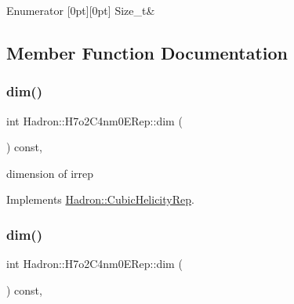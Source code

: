 \begin{DoxyEnumFields}{Enumerator}
[0pt][0pt]{}\mbox{\label{structHadron_1_1H7o2C4nm0ERep_a7de8eb68f5cce7258fc6e40d6bca862caddeac2d7be29ccf0b208d4254ce42357}} 
Size\+\_\+t&\\
\hline

\end{DoxyEnumFields}


\subsection{Member Function Documentation}
\mbox{\label{structHadron_1_1H7o2C4nm0ERep_aed3aeb03b51c80a7ee0d02b8cc1a3ecf}} 
\subsubsection{\texorpdfstring{dim()}{dim()}\hspace{0.1cm}{\footnotesize\ttfamily [1/3]}}
{\footnotesize\ttfamily int Hadron\+::\+H7o2\+C4nm0\+E\+Rep\+::dim (\begin{DoxyParamCaption}{ }\end{DoxyParamCaption}) const\hspace{0.3cm}{\ttfamily [inline]}, {\ttfamily [virtual]}}

dimension of irrep 

Implements \mbox{\hyperlink{structHadron_1_1CubicHelicityRep_a95d229a05580e65f8bdde74a1e316855}{Hadron\+::\+Cubic\+Helicity\+Rep}}.

\mbox{\label{structHadron_1_1H7o2C4nm0ERep_aed3aeb03b51c80a7ee0d02b8cc1a3ecf}} 
\subsubsection{\texorpdfstring{dim()}{dim()}\hspace{0.1cm}{\footnotesize\ttfamily [2/3]}}
{\footnotesize\ttfamily int Hadron\+::\+H7o2\+C4nm0\+E\+Rep\+::dim (\begin{DoxyParamCaption}{ }\end{DoxyParamCaption}) const\hspace{0.3cm}{\ttfamily [inline]}, {\ttfamily [virtual]}}


